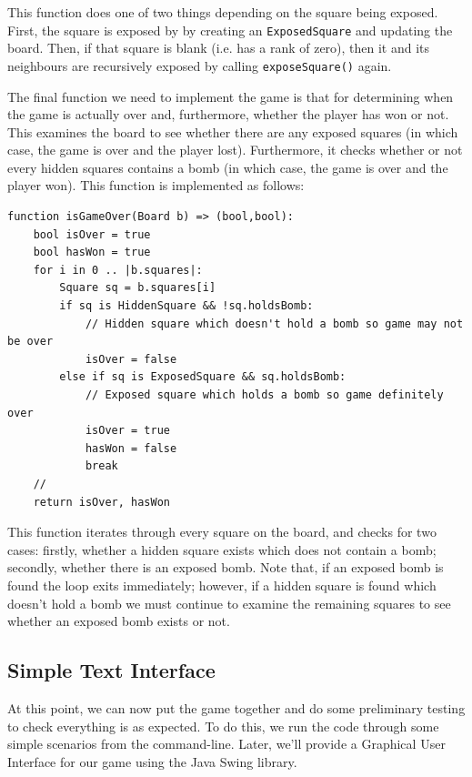 This function does one of two things depending on the square being exposed.  First, the square is exposed by by creating an \lstinline{ExposedSquare} and updating the board.  Then, if that square is blank (i.e. has a rank of zero), then it and its neighbours are recursively exposed by calling \lstinline{exposeSquare()} again.

The final function we need to implement the game is that for determining when the game is actually over and, furthermore, whether the player has won or not.  This examines the board to see whether there are any exposed squares (in which case, the game is over and the player lost).  Furthermore, it checks whether or not every hidden squares contains a bomb (in which case, the game is over and the player won).  This function is implemented as follows:

\begin{lstlisting}
function isGameOver(Board b) => (bool,bool):
    bool isOver = true
    bool hasWon = true
    for i in 0 .. |b.squares|:
        Square sq = b.squares[i]
        if sq is HiddenSquare && !sq.holdsBomb:
            // Hidden square which doesn't hold a bomb so game may not be over
            isOver = false
        else if sq is ExposedSquare && sq.holdsBomb:
            // Exposed square which holds a bomb so game definitely over
            isOver = true
            hasWon = false
            break
    //
    return isOver, hasWon
\end{lstlisting}
This function iterates through every square on the board, and checks for two cases: firstly, whether a hidden square exists which does not contain a bomb; secondly, whether there is an exposed bomb.  Note that, if an exposed bomb is found the loop exits immediately; however, if a hidden square is found which doesn't hold a bomb we must continue to examine the remaining squares to see whether an exposed bomb exists or not.

\subsection{Simple Text Interface}
At this point, we can now put the game together and do some preliminary testing to check everything is as expected.  To do this, we run the code through some simple scenarios from the command-line.  Later, we'll provide a Graphical User Interface for our game using the Java Swing library. 

